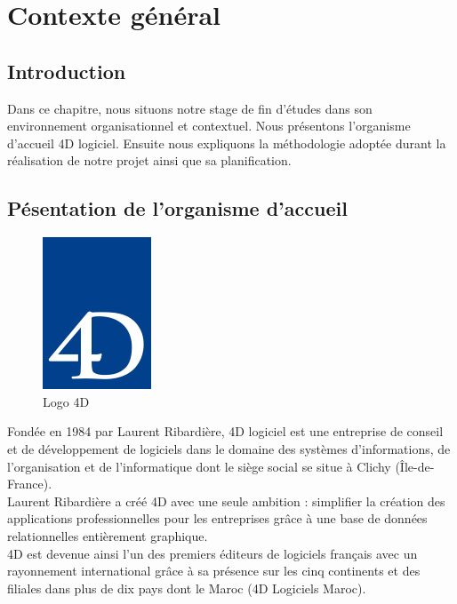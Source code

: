 \chapter{Contexte général}
\label{chap:Contexte général}


\section*{Introduction}
Dans ce chapitre, nous situons notre stage de fin d’études dans son environnement organisationnel et contextuel. Nous présentons l’organisme d’accueil 4D logiciel. Ensuite nous expliquons la méthodologie adoptée durant la réalisation de notre projet ainsi que sa planification.

\newpage


\section{Pésentation de l’organisme d’accueil}

\begin{figure}[h]
    \centering
    \includegraphics[scale=0.5]{Logos/Logo-4D.jpg} %
    \caption{Logo 4D}
    \label{fig:Logo4D}
\end{figure}

Fondée en 1984 par Laurent Ribardière, 4D logiciel est une entreprise de conseil et de
développement de logiciels dans le domaine des systèmes d’informations, de l’organisation
et de l’informatique dont le siège social se situe à Clichy (Île-de-France).\\

Laurent Ribardière a créé 4D avec une seule ambition : simplifier la création des
applications professionnelles pour les entreprises grâce à une base de données relationnelles
entièrement graphique.\\

4D est devenue ainsi l’un des premiers éditeurs de logiciels français avec un rayonnement international grâce à sa présence sur les cinq continents et des filiales dans plus de
dix pays dont le Maroc (4D Logiciels Maroc).\\

